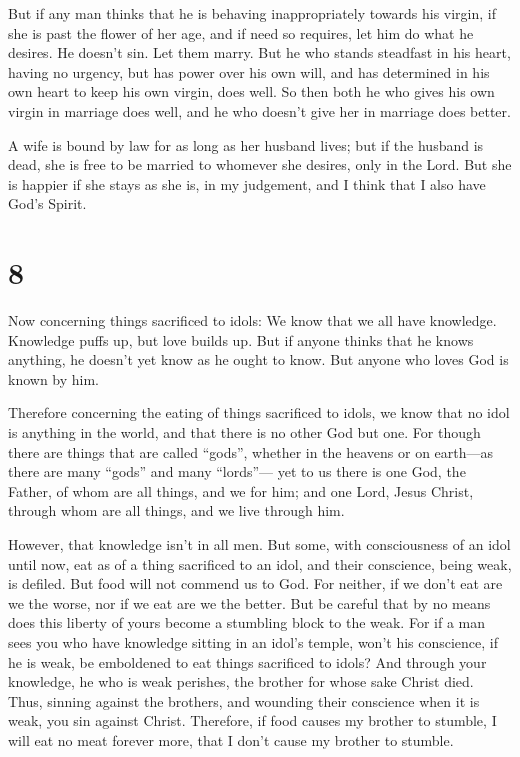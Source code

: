  But if any man thinks that he is behaving
inappropriately towards his virgin, if she is past the flower of her
age, and if need so requires, let him do what he desires. He doesn't
sin. Let them marry.  But he who stands steadfast in his
heart, having no urgency, but has power over his own will, and has
determined in his own heart to keep his own virgin, does well.
 So then both he who gives his own virgin in marriage
does well, and he who doesn't give her in marriage does better.

 A wife is bound by law for as long as her husband lives;
but if the husband is dead, she is free to be married to whomever she
desires, only in the Lord.  But she is happier if she
stays as she is, in my judgement, and I think that I also have God's
Spirit.

\hypertarget{section-7}{%
\section{8}\label{section-7}}

 Now concerning things sacrificed to idols: We know that
we all have knowledge. Knowledge puffs up, but love builds up.
 But if anyone thinks that he knows anything, he doesn't
yet know as he ought to know.  But anyone who loves God is
known by him.

 Therefore concerning the eating of things sacrificed to
idols, we know that no idol is anything in the world, and that there is
no other God but one.  For though there are things that
are called ``gods'', whether in the heavens or on earth---as there are
many ``gods'' and many ``lords''---  yet to us there is
one God, the Father, of whom are all things, and we for him; and one
Lord, Jesus Christ, through whom are all things, and we live through
him.

 However, that knowledge isn't in all men. But some, with
consciousness of an idol until now, eat as of a thing sacrificed to an
idol, and their conscience, being weak, is defiled.  But
food will not commend us to God. For neither, if we don't eat are we the
worse, nor if we eat are we the better.  But be careful
that by no means does this liberty of yours become a stumbling block to
the weak.  For if a man sees you who have knowledge
sitting in an idol's temple, won't his conscience, if he is weak, be
emboldened to eat things sacrificed to idols?  And
through your knowledge, he who is weak perishes, the brother for whose
sake Christ died.  Thus, sinning against the brothers,
and wounding their conscience when it is weak, you sin against Christ.
 Therefore, if food causes my brother to stumble, I will
eat no meat forever more, that I don't cause my brother to stumble.

